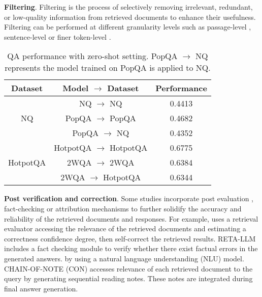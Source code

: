 \textbf{Filtering}. Filtering is the process of selectively removing irrelevant, redundant, or low-quality information from retrieved documents to enhance their usefulness. Filtering can be performed at different granularity levels such as passage-level \cite{asai-etal-2022-evidentiality, yoran2023making, asai2023self}, sentence-level \cite{wang2023learning, hwang-etal-2024-dslr} or finer token-level \cite{jin-etal-2024-bider, anderson-etal-2022-lingua, jiang-etal-2024-longllmlingua}.  %
\begin{table}[H]
\caption{\textmd{QA performance with zero-shot setting. PopQA $\to$ NQ represents the model trained on PopQA is applied to NQ.}}
  \centering
    \begin{tabular}{ccc}
          \toprule
          \textbf{Dataset} & \textbf{Model $\to$ Dataset}  & \textbf{Performance} \\ \hline
     \multirow{3}[3]{*}{NQ} & NQ $\to$ NQ & 0.4413 \\
     & PopQA $\to$ PopQA & 0.4682 \\
     & PopQA $\to$ NQ & 0.4352 \\
    \midrule
    \multirow{3}[3]{*}{HotpotQA} & HotpotQA $\to$ HotpotQA & 0.6775 \\
     & 2WQA $\to$ 2WQA & 0.6384 \\
     & 2WQA $\to$ HotpotQA & 0.6344 \\
    \bottomrule
    \end{tabular}
  \label{tab:zero-shot}%
\end{table}%
 \textbf{Post verification and correction}. Some studies incorporate post evaluation \cite{yan2024corrective}, fact-checking \cite{liu2306reta} or attribution \cite{gao-etal-2023-rarr} mechanisms to further solidify the accuracy and reliability of the retrieved documents and responses. For example,  \cite{yan2024corrective} uses a retrieval evaluator accessing the relevance of the retrieved documents and estimating a correctness confidence degree, then self-correct the retrieved results. RETA-LLM \cite{liu2306reta} includes a fact checking module to verify whether there exist factual errors in the generated answers. by using a natural language understanding (NLU) model. CHAIN-OF-NOTE (CON) \cite{yu-etal-2024-chain} accesses relevance of each retrieved document to the query by generating sequential reading notes. These notes are integrated during final answer generation. 
 
